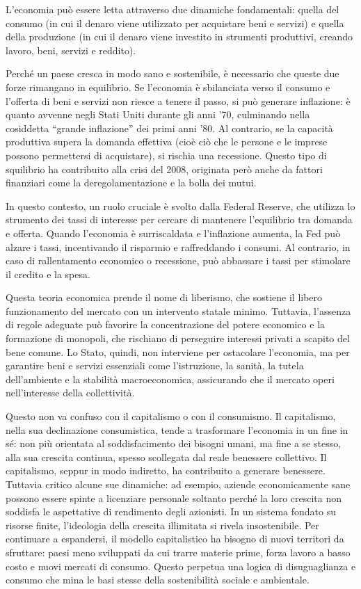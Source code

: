 \documentclass[12pt]{book} %
\begin{document}
L'economia può essere letta attraverso due dinamiche fondamentali: quella del consumo (in cui il denaro viene utilizzato per acquistare beni e servizi) e quella della produzione (in cui il denaro viene investito in strumenti produttivi, creando lavoro, beni, servizi e reddito).

Perché un paese cresca in modo sano e sostenibile, è necessario che queste due forze rimangano in equilibrio.
Se l’economia è sbilanciata verso il consumo e l’offerta di beni e servizi non riesce a tenere il passo, si può generare inflazione: è quanto avvenne negli Stati Uniti durante gli anni '70, culminando nella cosiddetta “grande inflazione” dei primi anni ’80.
Al contrario, se la capacità produttiva supera la domanda effettiva (cioè ciò che le persone e le imprese possono permettersi di acquistare), si rischia una recessione. Questo tipo di squilibrio ha contribuito alla crisi del 2008, originata però anche da fattori finanziari come la deregolamentazione e la bolla dei mutui.

In questo contesto, un ruolo cruciale è svolto dalla Federal Reserve, che utilizza lo strumento dei tassi di interesse per cercare di mantenere l’equilibrio tra domanda e offerta.
Quando l’economia è surriscaldata e l’inflazione aumenta, la Fed può alzare i tassi, incentivando il risparmio e raffreddando i consumi. Al contrario, in caso di rallentamento economico o recessione, può abbassare i tassi per stimolare il credito e la spesa.

Questa teoria economica prende il nome di liberismo, che sostiene il libero funzionamento del mercato con un intervento statale minimo. Tuttavia, l’assenza di regole adeguate può favorire la concentrazione del potere economico e la formazione di monopoli, che rischiano di perseguire interessi privati a scapito del bene comune.
Lo Stato, quindi, non interviene per ostacolare l’economia, ma per garantire beni e servizi essenziali come l’istruzione, la sanità, la tutela dell’ambiente e la stabilità macroeconomica, assicurando che il mercato operi nell’interesse della collettività.

Questo non va confuso con il capitalismo o con il consumismo. Il capitalismo, nella sua declinazione consumistica, tende a trasformare l’economia in un fine in sé: non più orientata al soddisfacimento dei bisogni umani, ma fine a se stesso, alla sua crescita continua, spesso scollegata dal reale benessere collettivo.
Il capitalismo, seppur in modo indiretto, ha contribuito a generare benessere. Tuttavia critico alcune sue dinamiche: ad esempio, aziende economicamente sane possono essere spinte a licenziare personale soltanto perché la loro crescita non soddisfa le aspettative di rendimento degli azionisti.
In un sistema fondato su risorse finite, l’ideologia della crescita illimitata si rivela insostenibile. Per continuare a espandersi, il modello capitalistico ha bisogno di nuovi territori da sfruttare: paesi meno sviluppati da cui trarre materie prime, forza lavoro a basso costo e nuovi mercati di consumo. Questo perpetua una logica di disuguaglianza e consumo che mina le basi stesse della sostenibilità sociale e ambientale.
\end{document}
